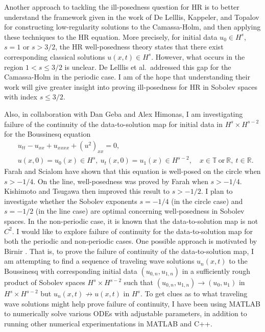\documentclass[12pt,reqno]{amsart}
\newcommand{\rr}{\mathbb{R}}
\newcommand{\ci}{\mathbb{T}}
\begin{document}
Another approach to tackling the ill-posedness question for HR is to better
understand the framework given in the work of De Lelllis, Kappeler, and Topalov
\cite{Lellis_2007_Low-regularity-} for constructing low-regularity solutions to
the Camassa-Holm, and then applying these techniques to the HR equation. More
precisely, for initial data $u_{0} \in H^{s}$, $s =1$ or $s > 3/2$, the HR
well-posedness theory states that there exist corresponding classical solutions
$u(x,t) \in H^{s}$. However, what occurs in the region $1 < s \le 3/2$ is
unclear. De Lelllis et al.\ addressed this gap for the Camassa-Holm in the
periodic case. I am of the hope that understanding their work will give greater
insight into proving ill-posedness for HR in Sobolev spaces with index $s \le
3/2$. 

Also, in collaboration with Dan Geba and Alex Himonas,
I am investigating failure of the continuity of the data-to-solution map for
initial data in $H^{s} \times H^{s-2}$ for the Boussinesq equation
\begin{align}
   & u_{tt} - u_{xx} + u_{xxxx} + (u^{2})_{xx} = 0,
  \\
   & u(x,0) = u_{0}(x) \in H^{s}, \  u_{t}(x,0) = u_{1}(x) \in H^{s-2},
  \quad x \in \ci \ \text{or} \ \rr, \ t \in \rr. 
\end{align} 
Farah and Scialom \cite{Farah:2010ys}  have shown that this equation is well-posed on the circle
when $s>-1/4$. On the line, well-posedness was proved 
by Farah \cite{Farah:2009uq} when $s>-1/4$. Kishimoto and Tsugawa
\cite{Kishimoto:2010ly} then improved this result to $s>-1/2$.  I  plan to
investigate whether the Sobolev exponents 
$s=-1/4$ (in the circle case) and  $s=-1/2$ (in the line case) 
are optimal concerning well-posedness in Sobolev spaces.
In the non-periodic case, it is known  \cite{Farah:2009uq} that
the data-to-solution map is not $C^2$.
I would like to explore failure of continuity
for the data-to-solution map for both the periodic
and non-periodic cases. One possible approach is motivated by Birnir
\cite{Birnir:1996uq}. That is, to prove the failure of continuity of the
data-to-solution map, I am attempting to find a sequence of traveling wave
solutions $u_{n}(x,t)$ to the Boussinesq with corresponding initial data
$(u_{0,n}, u_{1,n})$ in a sufficiently rough product of Sobolev spaces $H^{s} \times
H^{s-2}$ such that $(u_{0,n}, u_{1,n}) \to (u_{0}, u_{1})$ in
$H^{s} \times H^{s-2}$ but $u_{n}(x,t) \not \to u(x,t)$ in $H^{s}$. To get clues as to
what traveling wave solutions might help prove failure of continuity, I
have been using MATLAB to numerically solve various ODEs with adjustable
parameters, in addition to running other numerical experimentations in MATLAB
and C++. 
\end{document}
